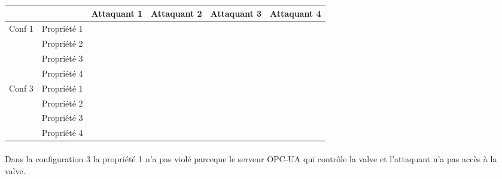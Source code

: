 \documentclass[10pt,a4paper]{article}
\newcommand{\cmark}{\ding{51}}%
\newcommand{\xmark}{\ding{55}}%
\begin{document}
\medskip
\small
\begin{tabular}{ll|c|c|c|c|}
\cline{3-6}
&  &  Attaquant 1 &  Attaquant 2 &  Attaquant 3 & Attaquant 4 \\ \hline
\multicolumn{1}{|l|}{\multirow{4}{*}{Conf 1}} & Propriété 1 &  \color{green}{\cmark} & \color{green}{\cmark} & \color{red}{\xmark} & \color{red}{\xmark}    \\ \cline{2-6} 
\multicolumn{1}{|l|}{}& Propriété 2 & \color{green}{\cmark} & \color{green}{\cmark} & \color{green}{\cmark} & \color{red}{\xmark}   \\ \cline{2-6} 
\multicolumn{1}{|l|}{}& Propriété 3 & \color{green}{\cmark} & \color{green}{\cmark} & \color{green}{\cmark} & \color{red}{\xmark}   \\\cline{2-6}
\multicolumn{1}{|l|}{}& Propriété 4 & \color{green}{\cmark} & \color{green}{\cmark} & \color{red}{\xmark} & \color{red}{\xmark}   \\ \hline

\multicolumn{1}{|l|}{\multirow{4}{*}{Conf 3}} & Propriété 1 & \color{red}{\xmark} & \color{red}{\xmark} & \color{red}{\xmark} & \color{red}{\xmark} \\ \cline{2-6} 
\multicolumn{1}{|l|}{}& Propriété 2 & \color{green}{\cmark} & \color{green}{\cmark} & \color{green}{\cmark} & \color{red}{\xmark} \\ \cline{2-6} 
\multicolumn{1}{|l|}{}& Propriété 3 & \color{green}{\cmark} & \color{green}{\cmark} & \color{green}{\cmark} & \color{red}{\xmark} \\ \cline{2-6}
\multicolumn{1}{|l|}{}& Propriété 4 & \color{green}{\cmark} & \color{green}{\cmark} & \color{red}{\xmark} & \color{red}{\xmark} \\ \hline
\end{tabular}
\paragraph{}
Dans la configuration 3 la propriété 1 n'a pas violé parceque le serveur OPC-UA qui contr\^{o}le la valve et l'attaquant n'a pas accès à la valve.  
\end{document}
